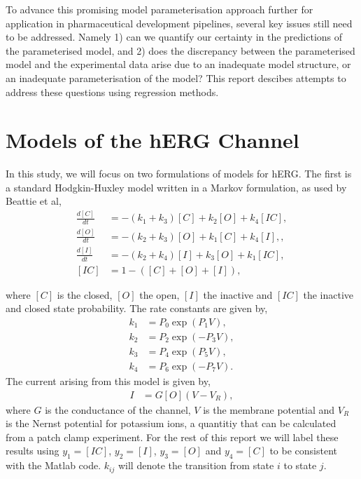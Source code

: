 \documentclass[11pt,a4paper,oneside]{article}
\begin{document}
To advance this promising model parameterisation approach further for application in pharmaceutical development pipelines, several key issues still need to be addressed. Namely 1) can we quantify our certainty in the predictions of the parameterised model, and 2) does the discrepancy between the parameterised model and the experimental data arise due to an inadequate model structure, or an inadequate parameterisation of the model? This report descibes attempts to address these questions using regression methods.

\section{Models of the hERG Channel} \label{Sec_ModelsOfHerg}

In this study, we will focus on two formulations of models for hERG. The first is a standard Hodgkin-Huxley model written in a Markov formulation, as used by Beattie et al\cite{Beattie2018},
\begin{align}
		\frac{d[C]}{dt}&= -(k_1+k_3)[C] + k_2 [O] + k_4[IC],\\ \label{Eq_dCdt}
		\frac{d[O]}{dt}&= -(k_2 + k_3 )[O] + k_1 [C] + k_4 [I],
		, \\
		\frac{d[I]}{dt}&= -(k_2 + k_4 )[I] + k_3 [O] + k_1 [IC],\\
		 [IC] &= 1 - ([C] + [O] + [I]),
\end{align}

where $ \left[ C \right] $ is the closed, $ \left[O \right]$ the open, $\left[ I \right]$ the inactive and $\left[ IC \right]$ the inactive and closed state probability. The rate constants are given by,
\begin{align}
k_1 & = P_0 \exp(P_1 V),\\ 
k_2 & = P_2 \exp( - P_3 V),\\ 
k_3 & = P_4 \exp(P_5 V),\\
k_4 & = P_6 \exp(- P_7 V).
\end{align}
The current arising from this model is given by,
\begin{align}
I & = G [O] (V-V_R), \label{Eq_I_hh}
\end{align}
where $G$ is the conductance of the channel, $V$ is the membrane potential and $V_R$ is the Nernst potential for potassium ions, a quantitiy that can be calculated from a patch clamp experiment. For the rest of this report we will label these results using $y_1 = [IC]$, $y_2=[I]$, $y_3 = [O]$ and $y_4 = [C]$ to be consistent with the Matlab code. $k_{ij}$ will denote the transition from state $i$ to state $j$.
\end{document}
